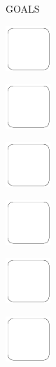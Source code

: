 \documentclass[11pt,titlepage]{article}
\begin{document}
\small %
\hfill GOALS

\vspace{6mm}

\noindent
\includegraphics[]{checkbox-10mm.pdf}

\vspace{14,7mm}

\noindent
\includegraphics[]{checkbox-10mm.pdf}

\vspace{14,7mm}

\noindent
\includegraphics[]{checkbox-10mm.pdf}

\vspace{14,7mm}

\noindent
\includegraphics[]{checkbox-10mm.pdf}

\vspace{14,7mm}

\noindent
\includegraphics[]{checkbox-10mm.pdf}

\vspace{14,7mm}

\noindent
\includegraphics[]{checkbox-10mm.pdf}

\pagebreak
\end{document}
